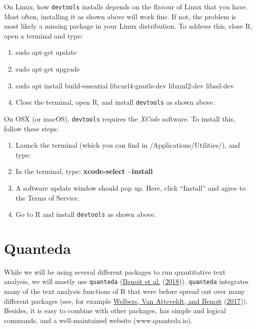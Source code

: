 \documentclass[
]{book}
\providecommand{\tightlist}{%
  \setlength{\itemsep}{0pt}\setlength{\parskip}{0pt}}
\begin{document}
On Linux, how \texttt{devtools} installs depends on the flavour of Linux that you have. Most often, installing it as shown above will work fine. If not, the problem is most likely a missing package in your Linux distribution. To address this, close R, open a terminal and type:

\begin{enumerate}
\def\labelenumi{\arabic{enumi}.}
\tightlist
\item
  sudo apt-get update
\item
  sudo apt-get upgrade
\item
  sudo apt install build-essential libcurl4-gnutls-dev libxml2-dev libssl-dev
\item
  Close the terminal, open R, and install \texttt{devtools} as shown above.
\end{enumerate}

On OSX (or macOS), \texttt{devtools} requires the \emph{XCode} software. To install this, follow these steps:

\begin{enumerate}
\def\labelenumi{\arabic{enumi}.}
\tightlist
\item
  Launch the terminal (which you can find in /Applications/Utilities/), and type:
\item
  In the terminal, type: \textbf{xcode-select --install}
\item
  A software update window should pop up. Here, click ``Install'' and agree to the Terms of Service.
\item
  Go to R and install \texttt{devtools} as shown above.
\end{enumerate}

\hypertarget{quanteda}{%
\section{Quanteda}\label{quanteda}}

While we will be using several different packages to run quantitative text analysis, we will mostly use \texttt{quanteda} (\protect\hyperlink{ref-Benoit2018}{Benoit et al.} (\protect\hyperlink{ref-Benoit2018}{2018})). \texttt{quanteda} integrates many of the text analysis functions of R that were before spread out over many different packages (see, for example \protect\hyperlink{ref-Welbers2017}{Welbers, Van Atteveldt, and Benoit} (\protect\hyperlink{ref-Welbers2017}{2017})). Besides, it is easy to combine with other packages, has simple and logical commands, and a well-maintained website (www.quanteda.io).
\end{document}

